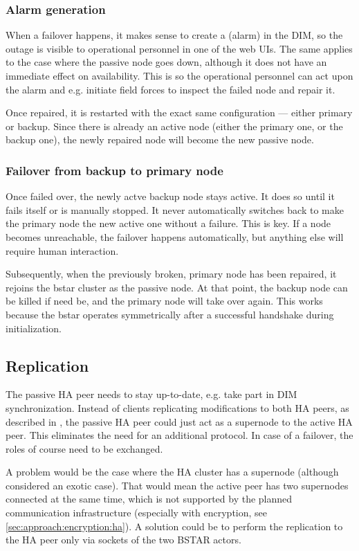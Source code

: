 \subsubsection{Alarm generation}
When a failover happens, it makes sense to create a  (alarm) in the
DIM, so the outage is visible to operational personnel in one of the web UIs.
The same applies to the case where the passive node goes down, although it
does not have an immediate effect on availability.  This is so the operational
personnel can act upon the alarm and e.g. initiate field forces to inspect the
failed node and repair it.

Once repaired, it is restarted with the exact same configuration --- either primary
or backup. Since there is already an active node (either the primary one,
or the backup one), the newly repaired node will become the new passive node.

\subsubsection{Failover from backup to primary node}
Once failed over, the newly actve backup node stays active. It does so until it
fails itself or is manually stopped. It never automatically switches back to
make the primary node the new active one without a failure. This is key. If a
node becomes unreachable, the failover happens automatically, but anything else will
require human interaction.

Subsequently, when the previously broken, primary node has been repaired, it
rejoins the \gls{bstar} cluster as the passive node. At that point, the backup
node can be killed if need be, and the primary node will take over again.  This
works because the \gls{bstar} operates symmetrically after a successful
handshake during initialization.

\subsection{Replication}
The passive HA peer needs to stay up-to-date, e.g. take part in DIM
synchronization. Instead of clients replicating modifications to both HA peers, as
described in \cite[Chapter 5 - Advanced Pub-Sub Patterns, The Clustered Hashmap
Protocol]{zmq:zguide}, the passive HA peer could just act as a supernode to the
active HA peer. This eliminates the need for an additional protocol. In case of
a failover, the roles of course need to be exchanged.

{\color{red}A problem would be the case where the HA cluster has a supernode (although
considered an exotic case). That would mean the active peer has two supernodes
connected at the same time, which is not supported by the planned communication
infrastructure (especially with encryption, see
\autoref{sec:approach:encryption:ha}).  A solution could be to perform the
replication to the HA peer only via sockets of the two BSTAR actors.}

